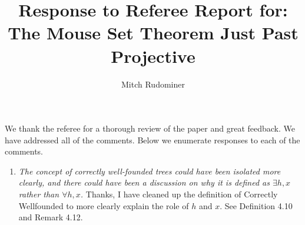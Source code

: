 \documentclass[oneside,12pt]{amsart}
\begin{document}
\title{Response to Referee Report for: The Mouse Set Theorem Just Past Projective}
\author{Mitch Rudominer}

\maketitle

We thank the referee for a thorough review of the paper and great feedback. We have addressed all of the comments.
Below we enumerate responses to each of the comments.


\begin{enumerate} [label=\alph*)]
\item  \emph{The concept of correctly well-founded trees could have been isolated more clearly, and there could have been a discussion on why it is defined as $\exists h,x$ rather than $\forall h,x$.} Thanks, I have cleaned up the definition of Correctly Wellfounded to more clearly explain the role of $h$ and $x$. See Definition 4.10 and Remark 4.12.
\end{enumerate}
\end{document}
